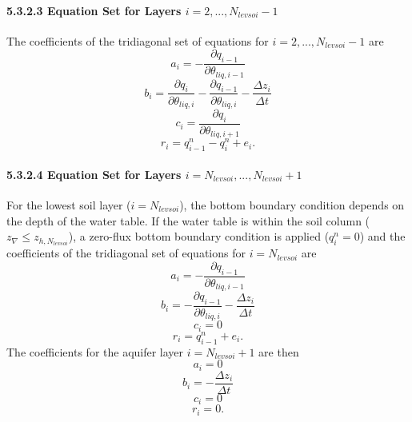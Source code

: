 \documentclass[12pt,authoryear]{elsarticle}
\numberwithin{equation}{section} %
\begin{document}
\paragraph{5.3.2.3 Equation Set for Layers $i=2,...,N_{levsoi}-1$}
%
The coefficients of the tridiagonal set of equations for $i=2,...,N_{levsoi}-1$ are
\begin{equation}
a_{i} = -\frac{\partial q_{i-1}}{\partial \theta_{liq,i-1}}
\end{equation}
\begin{equation}
b_{i} = \frac{\partial q_{i}}{\partial \theta_{liq,i}} - \frac{\partial q_{i-1}}{\partial \theta_{liq,i}} - \frac{\Delta z_{i}}{\Delta t}
\end{equation}
\begin{equation}
c_{i} = \frac{\partial q_{i}}{\partial \theta_{liq,i+1}}
\end{equation}
\begin{equation}
r_{i} = q_{i-1}^{n}-q_{i}^{n}+e_{i}.
\end{equation}
\paragraph{5.3.2.4 Equation Set for Layers $i=N_{levsoi},...,N_{levsoi}+1$}
%
For the lowest soil layer ($i=N_{levsoi}$), the bottom boundary condition depends on the depth of the water table. If the water table is within the soil column ($z_{\nabla}\leq z_{h,N_{levsoi}}$), a zero-flux bottom boundary condition is applied ($q_{i}^n = 0$) and the coefficients of the tridiagonal set of equations for $i=N_{levsoi}$ are
\begin{equation}
a_{i} = -\frac{\partial q_{i-1}}{\partial \theta_{liq,i-1}}
\end{equation}
\begin{equation}
b_{i} = - \frac{\partial q_{i-1}}{\partial \theta_{liq,i}} - \frac{\Delta z_{i}}{\Delta t}
\end{equation}
\begin{equation}
c_{i} = 0
\end{equation}
\begin{equation}
r_{i} = q_{i-1}^{n}+e_{i}.
\end{equation}
The coefficients for the aquifer layer $i=N_{levsoi}+1$ are then
\begin{equation}
a_{i} = 0
\end{equation}
\begin{equation}
b_{i} = - \frac{\Delta z_{i}}{\Delta t}
\end{equation}
\begin{equation}
c_{i} = 0
\end{equation}
\begin{equation}
r_{i} = 0.
\end{equation}
\end{document}
